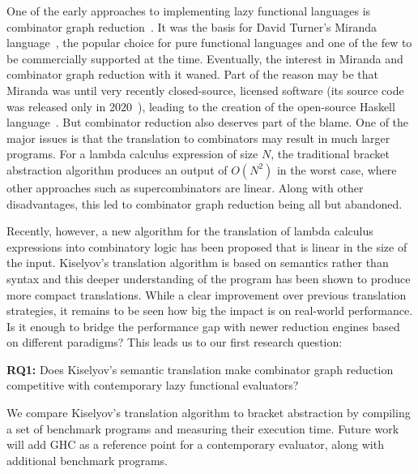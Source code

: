 \documentclass[conference]{IEEEtran}
\begin{document}
One of the early approaches to implementing lazy functional languages is combinator graph reduction~\cite{turner_new_1979}.
It was the basis for David Turner's Miranda language~\cite{turner_miranda_1985}, the popular choice for pure functional languages and one of the few to be commercially supported at the time.
Eventually, the interest in Miranda and combinator graph reduction with it waned.
Part of the reason may be that Miranda was until very recently closed-source, licensed software (its source code was released only in 2020~\cite{turner_open_2021}), leading to the creation of the open-source Haskell language~\cite{hudak_history_2007}.
But combinator reduction also deserves part of the blame.
One of the major issues is that the translation to combinators may result in much larger programs.
For a lambda calculus expression of size $N$, the traditional bracket abstraction algorithm produces an output of $O(N^2)$ in the worst case, where other approaches such as supercombinators are linear\cite{spj_impl}.
Along with other disadvantages, this led to combinator graph reduction being all but abandoned.

Recently, however, a new algorithm for the translation of lambda calculus expressions into combinatory logic has been proposed that is linear in the size of the input\cite{kiselyov_lambda_2018}.
Kiselyov's translation algorithm is based on semantics rather than syntax and this deeper understanding of the program has been shown to produce more compact translations.
While a clear improvement over previous translation strategies, it remains to be seen how big the impact is on real-world performance.
Is it enough to bridge the performance gap with newer reduction engines based on different paradigms?
This leads us to our first research question:

\textbf{RQ1:} Does Kiselyov's semantic translation make combinator graph reduction competitive with contemporary lazy functional evaluators?

We compare Kiselyov's translation algorithm to bracket abstraction by compiling a set of benchmark programs and measuring their execution time.
Future work will add GHC as a reference point for a contemporary evaluator, along with additional benchmark programs.
\end{document}
